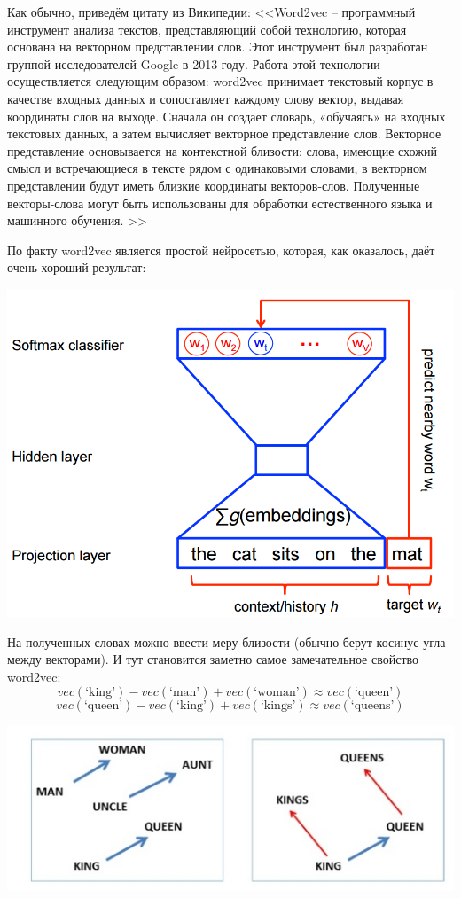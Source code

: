\documentclass[a4paper,14pt]{extarticle}
\begin{document}
Как обычно, приведём цитату из Википедии: <<Word2vec – программный инструмент анализа текстов, представляющий собой технологию, которая основана на векторном представлении слов. Этот инструмент был разработан группой исследователей Google в 2013 году. Работа этой технологии осуществляется следующим образом: word2vec принимает текстовый корпус в качестве входных данных и сопоставляет каждому слову вектор, выдавая координаты слов на выходе. Сначала он создает словарь, «обучаясь» на входных текстовых данных, а затем вычисляет векторное представление слов. Векторное представление основывается на контекстной близости: слова, имеющие схожий смысл и встречающиеся в тексте рядом с одинаковыми словами, в векторном представлении будут иметь близкие координаты векторов-слов. Полученные векторы-слова могут быть использованы для обработки естественного языка и машинного обучения. >>

По факту word2vec является простой нейросетью, которая, как оказалось, даёт очень хороший результат:

\medskip

\includegraphics[width=1.0\linewidth]{word2vec.png}

На полученных словах можно ввести меру близости (обычно берут косинус угла между векторами). И тут становится заметно самое замечательное свойство word2vec:
\[
vec(\text{`king'}) - vec(\text{`man'}) + vec(\text{`woman'}) \approx vec(\text{`queen'})
\]
\[
vec(\text{`queen'}) - vec(\text{`king'}) + vec(\text{`kings'}) \approx vec(\text{`queens'})
\]

\medskip

\includegraphics[width=1.0\linewidth]{word2vec_2.png}
\end{document}
